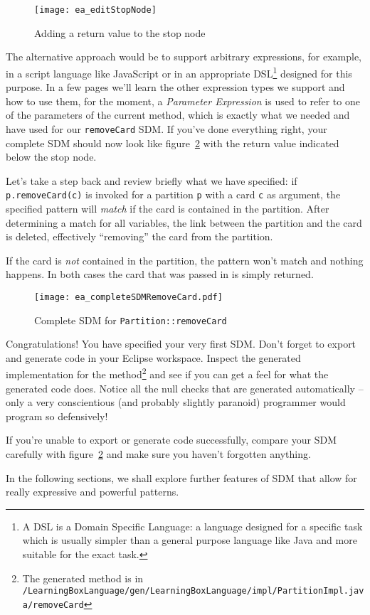 \begin{figure}[htp]
\begin{center}
  \texttt{[image: ea\_editStopNode]}
  \caption{Adding a return value to the stop node}  
  \label{fig:stop_node_return_value}
\end{center}
\end{figure}

The alternative approach would be to support arbitrary expressions, for example, in a script language like JavaScript or in an appropriate DSL\footnote{A DSL is
a Domain Specific Language: a language designed for a specific task which is usually simpler than a general purpose language like Java and more suitable for the
exact task.} designed for this purpose. In a few pages we'll learn the other expression types  we support and how to use them, for
the moment, a \emph{Parameter Expression} is used to refer to one of the parameters of the current method, which is exactly what we needed and have used for our
\texttt{removeCard} SDM. If you've done everything right, your complete SDM should now look like figure~\ref{fig:sdm_complete_control_flow} with the return value
indicated below the stop node.

Let's take a step back and review briefly what we have specified:  if \texttt{p.remove\-Card(c)} is invoked for a partition \texttt{p} with a card \texttt{c} as
argument, the specified pattern will \emph{match} if the card is contained in the partition. After determining a match for all variables, the link between the
partition and the card is deleted, effectively ``removing'' the card from the partition.

If the card is \emph{not} contained in the partition, the pattern won't match and nothing happens. In both cases the card that was passed in is simply returned.

\begin{figure}[htbp]
\begin{center}
  \texttt{[image: ea\_completeSDMRemoveCard.pdf]}
  \caption{Complete SDM for \texttt{Partition::removeCard}}  
  \label{fig:sdm_complete_control_flow}
\end{center}
\end{figure}

Congratulations!  You have specified your very first SDM.
Don't forget to export and generate code in your Eclipse workspace.
Inspect the generated implementation for the method\footnote{The generated method is in
\texttt{/Learning\-Box\-Language/\-gen/\-Learning\-Box\-Language/\-impl/\-Partition\-Impl.java/\-remove\-Card}} and see if you can get a feel for what the
generated code does.
Notice all the null checks that are generated automatically -- only a very conscientious (and probably slightly paranoid) programmer would program so
defensively!

If you're unable to export or generate code successfully, compare your SDM carefully with figure~\ref{fig:sdm_complete_control_flow} and make sure you haven't
forgotten anything.

In the following sections, we shall explore further features of SDM that allow for really expressive and powerful patterns.
